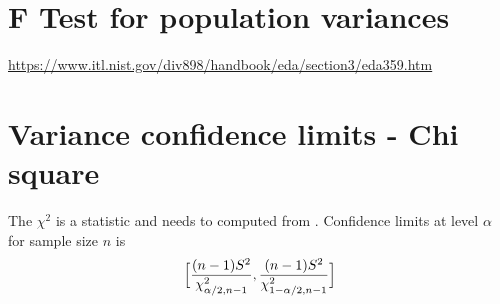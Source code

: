 \documentclass{article}
\newcommand{\beq}{\begin{equation}}
\newcommand{\eeq}{\end{equation}}
\begin{document}
\section{F Test for population variances}
\url{https://www.itl.nist.gov/div898/handbook/eda/section3/eda359.htm}
\section{Variance confidence limits - Chi square}
The $\chi^2$ is a statistic and needs to computed from . Confidence limits at level $\alpha$ for sample size $n$ is 
\beq 
\Big{[}\frac{(n-1)S^2}{\chi^2_{\alpha/2,n-1}},\frac{(n-1)S^2}{\chi^2_{1-\alpha/2,n-1}}\Big{]}
\eeq
\end{document}

